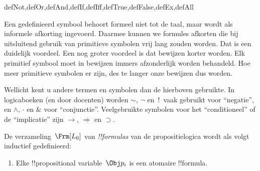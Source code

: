 \documentclass[openany]{memoir}
\begin{document}
\begin{tagblock}{defNot,defOr,defAnd,defIf,defIff,defTrue,defFalse,defEx,defAll}
\begin{explain}
Een gedefinieerd symbool behoort formeel niet tot de taal, maar wordt
als informele afkorting ingevoerd. Daarmee kunnen we formules afkorten
die bij uitsluitend gebruik van primitieve symbolen vrij lang zouden
worden. Dat is een duidelijk voordeel. Een nog groter voordeel is dat
bewijzen korter worden. Elk primitief symbool moet in bewijzen immers
afzonderlijk worden behandeld. Hoe meer primitieve symbolen er zijn,
des te langer onze bewijzen dus worden.
\end{explain}
\end{tagblock}


\begin{intro}
Wellicht kent u andere termen en symbolen dan de hierboven gebruikte.
In logicaboeken (en door docenten) worden $\sim$, $\neg$ en~!\ vaak
gebruikt voor ``negatie'', en $\wedge$, $\cdot$ en $\&$ voor
``conjunctie''. Veelgebruikte symbolen voor het ``conditioneel'' of de
``implicatie'' zijn
$\rightarrow$, $\Rightarrow$ en $\supset$.
\end{intro}

\begin{defn}[Formule]
De verzameling~$\Frm[L_0]$ van \emph{!!{formula}s} van de
propositielogica wordt als volgt inductief gedefinieerd:
\begin{enumerate}


\item Elke !!{propositional variable}~$\Obj p_i$ is een atomaire
  !!{formula}.






\end{enumerate}
\end{defn}
\end{document}
